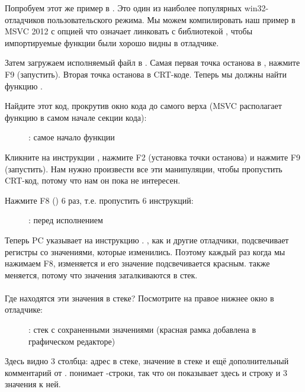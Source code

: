 \clearpage
{}
\myindex{\olly}

Попробуем этот же пример в \olly.
Это один из наиболее популярных win32-отладчиков пользовательского режима.
Мы можем компилировать наш пример в MSVC 2012 
с опцией  что означает линковать с библиотекой ,
чтобы импортируемые функции были хорошо видны в отладчике.

Затем загружаем исполняемый файл в \olly.
Самая первая точка останова в , нажмите F9 (запустить).
Вторая точка останова в \ac{CRT}-коде.
Теперь мы должны найти функцию \main.

Найдите этот код, прокрутив окно кода до самого верха (MSVC располагает функцию \main в самом начале секции кода): 

\begin{figure}[H]
\centering
{}
\caption{\olly: самое начало функции \main}
\label{fig:printf3_olly_1}
\end{figure}

Кликните на инструкции , нажмите F2 (установка точки останова) и нажмите F9 (запустить).
Нам нужно произвести все эти манипуляции, чтобы пропустить \ac{CRT}-код, потому что нам он пока
не интересен.

\clearpage
Нажмите F8 (\stepover) 6 раз, т.е. пропустить 6 инструкций:

\begin{figure}[H]
\centering
{}
\caption{\olly: перед исполнением \printf}
\label{fig:printf3_olly_2}
\end{figure}

Теперь \ac{PC} указывает на инструкцию .
\olly, как и другие отладчики, подсвечивает регистры со значениями, которые изменились.
Поэтому каждый раз когда мы нажимаем F8, \EIP изменяется и его значение подсвечивается красным.
\ESP также меняется, потому что значения заталкиваются в стек.\\
\\
Где находятся эти значения в стеке?
Посмотрите на правое нижнее окно в отладчике:

\begin{figure}[H]
\centering

\caption{\olly: стек с сохраненными значениями (красная рамка добавлена в графическом редакторе)}
\end{figure}

Здесь видно 3 столбца: адрес в стеке, значение в стеке и ещё дополнительный комментарий
от \olly. 
\olly понимает \printf{}-строки, так что он показывает здесь и строку и 3 значения  к ней.

